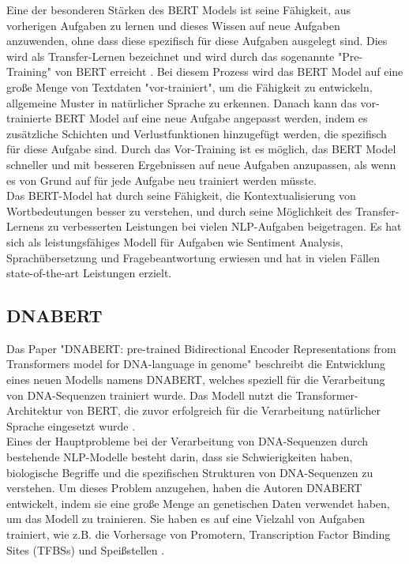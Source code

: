 \documentclass[oneside,bibliography=totocnumbered,BCOR=5mm]{scrbook}%
\theoremstyle{definition}
\theoremstyle{definition}
\theoremstyle{definition}
\theoremstyle{definition}
\theoremstyle{definition}
\theoremstyle{definition}
\begin{document}
Eine der besonderen Stärken des BERT Models ist seine Fähigkeit, aus vorherigen Aufgaben zu lernen und 
dieses Wissen auf neue Aufgaben anzuwenden, ohne dass diese spezifisch für diese Aufgaben ausgelegt sind. 
Dies wird als Transfer-Lernen bezeichnet und wird durch das sogenannte "Pre-Training" von BERT erreicht \autocite[Seite 3]{bert}. 
Bei diesem Prozess wird das BERT Model auf eine große Menge von Textdaten "vor-trainiert", 
um die Fähigkeit zu entwickeln, allgemeine Muster in natürlicher Sprache zu erkennen. 
Danach kann das vor-trainierte BERT Model auf eine neue Aufgabe angepasst werden, 
indem es zusätzliche Schichten und Verlustfunktionen hinzugefügt werden, die spezifisch für diese Aufgabe sind. 
Durch das Vor-Training ist es möglich, das BERT Model schneller und mit besseren Ergebnissen auf neue Aufgaben anzupassen, 
als wenn es von Grund auf für jede Aufgabe neu trainiert werden müsste. \\


Das BERT-Model hat durch seine Fähigkeit, die Kontextualisierung von Wortbedeutungen besser zu verstehen, 
und durch seine Möglichkeit des Transfer-Lernens
zu verbesserten Leistungen bei vielen NLP-Aufgaben beigetragen. 
Es hat sich als leistungsfähiges Modell für Aufgaben wie Sentiment Analysis, 
Sprachübersetzung und Fragebeantwortung erwiesen und hat in vielen Fällen state-of-the-art Leistungen erzielt. \\
\linebreak[4]


\subsection{DNABERT}

Das Paper "DNABERT: pre-trained Bidirectional Encoder Representations from Transformers model 
for DNA-language in genome" beschreibt die Entwicklung eines neuen Modells namens DNABERT, 
welches speziell für die Verarbeitung von DNA-Sequenzen trainiert wurde. 
Das Modell nutzt die Transformer-Architektur von BERT, die zuvor erfolgreich für die Verarbeitung 
natürlicher Sprache eingesetzt wurde \autocite[Seite 2113]{dnabert}. \\


Eines der Hauptprobleme bei der Verarbeitung von DNA-Sequenzen durch bestehende NLP-Modelle 
besteht darin, dass sie Schwierigkeiten haben, 
biologische Begriffe und die spezifischen Strukturen von DNA-Sequenzen zu verstehen. 
Um dieses Problem anzugehen, haben die Autoren DNABERT entwickelt, 
indem sie eine große Menge an genetischen Daten verwendet haben, 
um das Modell zu trainieren. 
Sie haben es auf eine Vielzahl von Aufgaben trainiert, wie z.B. 
die Vorhersage von Promotern, Transcription Factor Binding
Sites (TFBSs) und Speißstellen \autocite[Seite 2114]{dnabert}. \\
\end{document}
